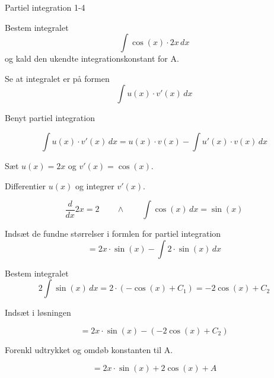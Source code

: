 \documentclass{article}
\begin{document}
\newpage

\begin{exercise}{Partiel integration 1-4}
	
	
	Bestem integralet
	\[
	\int \cos(x) \cdot 2x \, dx
	\]
	og kald den ukendte integrationskonstant for A.
	
	
	
	\hint
	
	Se at integralet er på formen
	\[
	\int u(x) \cdot v'(x) \, dx
	\]
	
	\hint
	
	Benyt partiel integration
	
	\hint
	\[
	\int u(x) \cdot v'(x)\, dx = u(x) \cdot v(x) - \int u'(x) \cdot v(x) \, dx
	\]
	\hint
	
	Sæt $u(x) = 2x$ og $v'(x) = \cos(x)$.
	
	
	\hint
	
	Differentier $u(x)$ og integrer $v'(x)$.
	
	\hint
	\[
	\frac{d}{dx}2x = 2 \qquad \wedge \qquad \int \cos(x) \, dx = \sin(x)
	\]
	
	\hint
	
	Indsæt de fundne størrelser i formlen for partiel integration
	\[
	= 2x \cdot \sin(x) - \int 2 \cdot \sin(x) \, dx
	\]
	
	\hint
	
	Bestem integralet
	\[
	2 \int \sin(x) \, dx = 2 \cdot (-\cos(x) + C_1) = -2 \cos(x) + C_2
	\]
	
	\hint
	Indsæt i løsningen 
	
	\hint
	
	\[
	= 2x \cdot \sin(x) -(-2 \cos(x) + C_2)
	\]
	
	\hint
	
	Forenkl udtrykket og omdøb konstanten til A.
	
	\hint
	
	\[
	= 2x \cdot \sin(x) + 2 \cos(x) + A
	\]
	
	
\end{exercise}

\newpage
\end{document}
